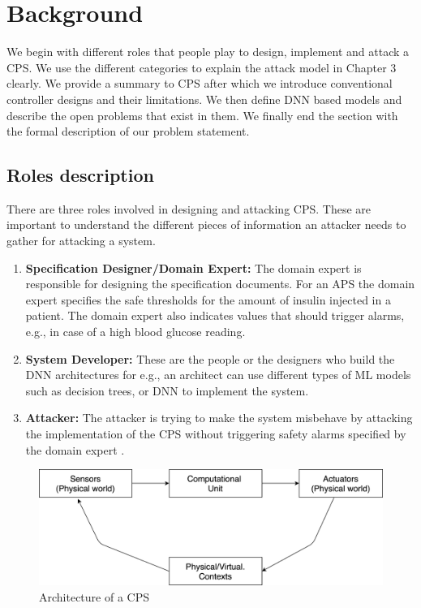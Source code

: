 \chapter{Background}
\label{ch:Chapter2}

We begin with different roles that people play to design, implement and attack a \ac{CPS}. We use the different categories to explain the attack model in Chapter 3 clearly. 
We provide a summary to \ac{CPS} after which we introduce conventional controller designs and their limitations. 
We then define \ac{DNN} based models and describe the open problems that exist in them. 
We finally end the section with the formal description of our problem statement.

\section{Roles description}
There are three roles involved in designing and attacking \ac{CPS}. These are important to understand the different pieces of information an attacker needs to gather for attacking a system.

\begin{enumerate}
	\item \textbf{Specification Designer/Domain Expert:} The domain expert is responsible for designing the specification documents. 
	For an \ac{APS} the domain expert specifies the safe thresholds for the amount of insulin injected in a patient. The domain expert also indicates values that should trigger alarms, e.g., in case of a high blood glucose reading. 
	\item \textbf{System Developer:} These are the people or the designers who
	build the \ac{DNN} architectures for e.g., an architect can use different types of \ac{ML} models such as decision trees, or \ac{DNN} to implement the system.
	\item \textbf{Attacker:} The attacker is trying to make the system misbehave by attacking the implementation of the \ac{CPS} without triggering safety alarms specified by the domain expert . 
\end{enumerate}

\begin{figure}
	\centering
	\includegraphics[width=0.7\linewidth]{Images/Systemsdescription}
	\caption{Architecture of a CPS}
	\label{fig:systemsdescription}
\end{figure}

